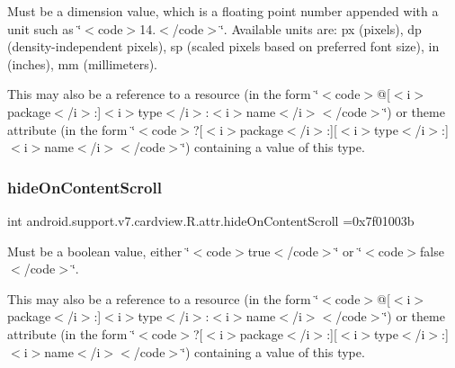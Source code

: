 Must be a dimension value, which is a floating point number appended with a unit such as \char`\"{}$<$code$>$14.\+5sp$<$/code$>$\char`\"{}. Available units are\+: px (pixels), dp (density-\/independent pixels), sp (scaled pixels based on preferred font size), in (inches), mm (millimeters). 

This may also be a reference to a resource (in the form \char`\"{}$<$code$>$@\mbox{[}$<$i$>$package$<$/i$>$\+:\mbox{]}$<$i$>$type$<$/i$>$\+:$<$i$>$name$<$/i$>$$<$/code$>$\char`\"{}) or theme attribute (in the form \char`\"{}$<$code$>$?\mbox{[}$<$i$>$package$<$/i$>$\+:\mbox{]}\mbox{[}$<$i$>$type$<$/i$>$\+:\mbox{]}$<$i$>$name$<$/i$>$$<$/code$>$\char`\"{}) containing a value of this type. \mbox{\label{classandroid_1_1support_1_1v7_1_1cardview_1_1R_1_1attr_a14d559ad97fd45b76bdbb6c0bec8ceca}} 
\subsubsection{\texorpdfstring{hide\+On\+Content\+Scroll}{hideOnContentScroll}}
{\footnotesize\ttfamily int android.\+support.\+v7.\+cardview.\+R.\+attr.\+hide\+On\+Content\+Scroll =0x7f01003b\hspace{0.3cm}{\ttfamily [static]}}

Must be a boolean value, either \char`\"{}$<$code$>$true$<$/code$>$\char`\"{} or \char`\"{}$<$code$>$false$<$/code$>$\char`\"{}. 

This may also be a reference to a resource (in the form \char`\"{}$<$code$>$@\mbox{[}$<$i$>$package$<$/i$>$\+:\mbox{]}$<$i$>$type$<$/i$>$\+:$<$i$>$name$<$/i$>$$<$/code$>$\char`\"{}) or theme attribute (in the form \char`\"{}$<$code$>$?\mbox{[}$<$i$>$package$<$/i$>$\+:\mbox{]}\mbox{[}$<$i$>$type$<$/i$>$\+:\mbox{]}$<$i$>$name$<$/i$>$$<$/code$>$\char`\"{}) containing a value of this type. \mbox{\label{classandroid_1_1support_1_1v7_1_1cardview_1_1R_1_1attr_a9a1dcb3b4d6c2da9c92a7c45799fc559}} 
